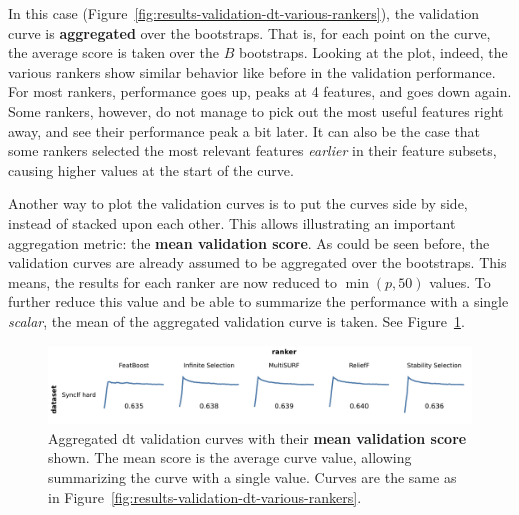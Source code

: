 \documentclass[../main.tex]{subfiles}
\begin{document}
In this case (Figure~\ref{fig:results-validation-dt-various-rankers}), the validation curve is \textbf{aggregated} over the bootstraps. That is, for each point on the curve, the average score is taken over the $B$ bootstraps. Looking at the plot, indeed, the various rankers show similar behavior like before in the validation performance. For most rankers, performance goes up, peaks at 4 features, and goes down again. Some rankers, however, do not manage to pick out the most useful features right away, and see their performance peak a bit later. It can also be the case that some rankers selected the most relevant features \textit{earlier} in their feature subsets, causing higher values at the start of the curve.



Another way to plot the validation curves is to put the curves side by side, instead of stacked upon each other. This allows illustrating an important aggregation metric: the \textbf{mean validation score}. As could be seen before, the validation curves are already assumed to be aggregated over the bootstraps. This means, the results for each ranker are now reduced to $\min(p, 50)$ values. To further reduce this value and be able to summarize the performance with a single \textit{scalar}, the mean of the aggregated validation curve is taken. See Figure~\ref{fig:results-validation-with-mean-score}.

\begin{figure}[ht]
    \centering
    \includegraphics[width=\linewidth]{report/images/results-validation-with-mean-score.pdf}
    \caption{Aggregated \gls{dt} validation curves with their \textbf{mean validation score} shown. The mean score is the average curve value, allowing summarizing the curve with a single value. Curves are the same as in Figure~\ref{fig:results-validation-dt-various-rankers}.}
    \label{fig:results-validation-with-mean-score}
\end{figure}
\end{document}
